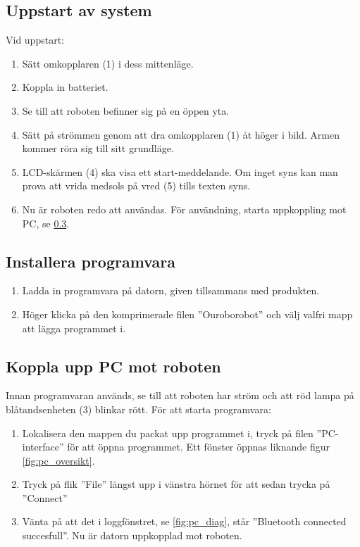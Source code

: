 \documentclass[a4paper,12pt]{article}
\begin{document}
\subsection{Uppstart av system}
Vid uppstart:
\begin{enumerate}
    \item Sätt omkopplaren (1) i dess mittenläge.
    \item Koppla in batteriet.
    \item Se till att roboten befinner sig på en öppen yta.
    \item Sätt på strömmen genom att dra omkopplaren (1) åt höger i bild. Armen kommer röra sig till sitt grundläge.
    \item LCD-skärmen (4) ska visa ett start-meddelande. Om inget syns kan man prova att vrida medsols på vred (5) tills texten syns.
    \item  Nu är roboten redo att användas. För användning, starta uppkoppling mot PC, se \ref{subsec:start_pc}.
\end{enumerate}

\subsection{Installera programvara}
\label{subsec:install_pc}
\begin{enumerate}
    \item Ladda in programvara på datorn, given tillsammans med produkten.
    \item Höger klicka på den komprimerade filen ''Ouroborobot'' och välj valfri mapp att lägga programmet i.
\end{enumerate}


\subsection{Koppla upp PC mot roboten}
\label{subsec:start_pc}
Innan programvaran används, se till att roboten har ström och att röd lampa på blåtandsenheten (3) blinkar rött. För att starta programvara:
\begin{enumerate}
    \item Lokalisera den mappen du packat upp programmet i, tryck på filen ''PC-interface'' för att öppna programmet.  Ett fönster öppnas liknande figur \ref{fig:pc_oversikt}. 
    \item Tryck på flik ''File''  längst upp i vänstra hörnet för att sedan trycka på ''Connect''
    \item Vänta på att det i loggfönstret, se \ref{fig:pc_diag}, står ''Bluetooth connected succesfull''. Nu är datorn uppkopplad mot roboten.
\end{enumerate}
\end{document}
